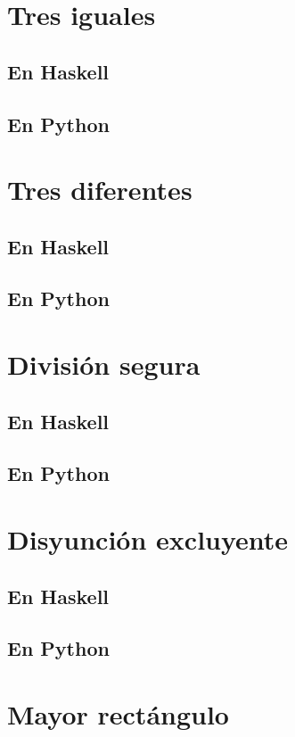 \documentclass[a4paper,12pt,twoside]{book}
\begin{document}
\section{Tres iguales}
\subsection*{En Haskell}
\subsection*{En Python}

\section{Tres diferentes}
\subsection*{En Haskell}
\subsection*{En Python}

\section{División segura}
\subsection*{En Haskell}
\subsection*{En Python}

\section{Disyunción excluyente}
\subsection*{En Haskell}
\subsection*{En Python}

\section{Mayor rectángulo}
\end{document}
